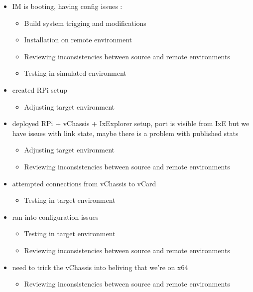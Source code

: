 \begin{itemize}
\item IM is booting, having config issues :
    \begin{itemize}
    \item Build system trigging and modifications
    \item Installation on remote environment
    \item Reviewing inconsistencies between source and remote environments
    \item Testing in simulated environment
    \end{itemize}

\item created RPi setup
    \begin{itemize}
    \item Adjusting target environment
    \end{itemize}

\item deployed RPi + vChassis + IxExplorer setup, port is visible from IxE but
we have issues with link state, maybe there is a problem with published stats
    \begin{itemize}
    \item Adjusting target environment
    \item Reviewing inconsistencies between source and remote environments
    \end{itemize}

\item attempted connections from vChassis to vCard
    \begin{itemize}
    \item Testing in target environment
    \end{itemize}

\item ran into configuration issues
    \begin{itemize}
    \item Testing in target environment
    \item Reviewing inconsistencies between source and remote environments
    \end{itemize}

\item need to trick the vChassis into beliving that we're on x64
    \begin{itemize}
    \item Reviewing inconsistencies between source and remote environments
    \end{itemize}
\end{itemize}


